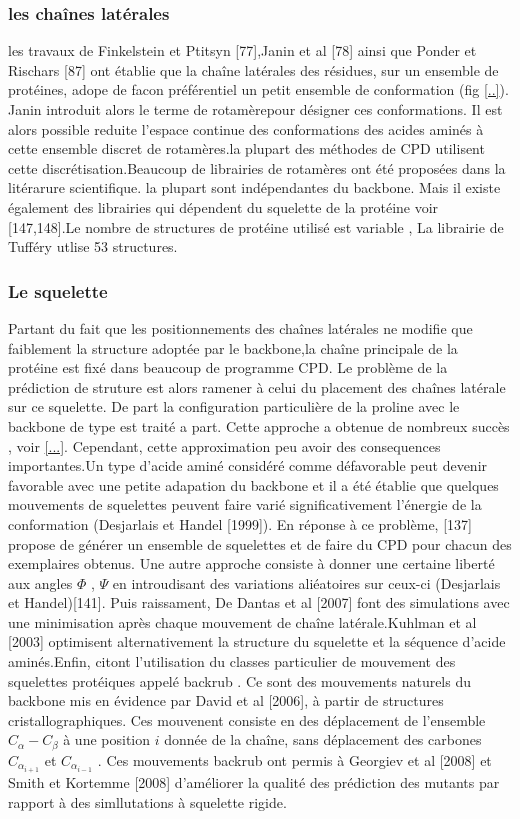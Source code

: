 \subsubsection{les chaînes latérales}

les travaux de Finkelstein et Ptitsyn [77],Janin et al [78] ainsi que Ponder et Rischars [87] ont établie que la chaîne latérales des résidues, sur un ensemble de protéines, adope de facon préférentiel un petit ensemble de conformation (fig \ref{..}). Janin introduit alors le terme de \og rotamère\fg pour désigner ces conformations. Il est alors possible reduite l'espace continue des conformations des acides aminés à cette ensemble discret de rotamères.la plupart des méthodes de CPD utilisent cette discrétisation.Beaucoup de librairies de rotamères ont été proposées dans la litérarure scientifique. la plupart sont indépendantes du backbone. Mais il existe également des librairies qui dépendent du squelette de la protéine voir [147,148].Le nombre de structures de protéine utilisé est variable , La librairie de Tufféry utlise 53 structures. 

\subsubsection{Le squelette}
Partant du fait que les positionnements des chaînes latérales ne modifie que faiblement la structure adoptée par le backbone,la chaîne principale de la protéine est fixé dans beaucoup de programme CPD. Le problème de la prédiction de struture est alors ramener à celui du placement des chaînes latérale sur ce squelette. De part la configuration particulière de la proline avec le backbone de type est traité a part. Cette approche a obtenue de nombreux succès , voir \ref{...}.
Cependant, cette approximation peu avoir des consequences importantes.Un type d'acide aminé considéré comme défavorable peut devenir favorable avec une petite adapation du backbone et il a été établie que quelques mouvements de squelettes peuvent faire varié significativement l'énergie de la conformation (Desjarlais et Handel [1999]).
En réponse à ce problème, [137] propose de générer un ensemble de squelettes et de faire du CPD pour chacun des exemplaires obtenus. Une autre approche consiste à donner une certaine liberté aux angles $\Phi$ , $\Psi$ en introudisant des variations aliéatoires sur ceux-ci (Desjarlais et Handel)[141].
Puis raissament, De Dantas et al [2007] font des simulations avec une minimisation après chaque mouvement de chaîne latérale.Kuhlman et al [2003] optimisent alternativement la structure du squelette et la séquence d'acide aminés.Enfin, citont l'utilisation du classes particulier de mouvement des squelettes protéiques appelé \og backrub \fg. Ce sont des mouvements naturels du backbone mis en évidence par David et al [2006], à partir de structures cristallographiques. Ces mouvenent consiste en des déplacement de l'ensemble $C_{\alpha}-C_{\beta}$ à une position $i$ donnée de la chaîne, sans déplacement des carbones $C_{\alpha_{i+1}}$ et $C_{\alpha_{i-1}}$ . Ces mouvements backrub ont permis à Georgiev et al [2008] et Smith et Kortemme [2008] d'améliorer la qualité des prédiction des mutants par rapport à des simllutations à squelette rigide.


